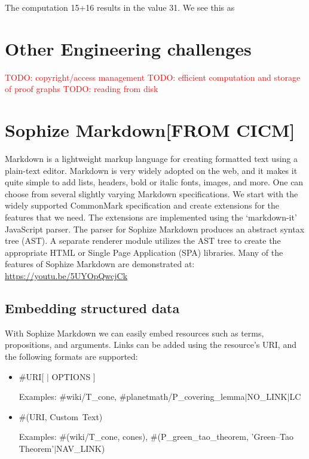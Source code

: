\documentclass[a4paper]{article}
\newcommand\todo[1]{\textcolor{red}{TODO: #1}}
\begin{document}
The computation 15+16 results in the value 31. We see this as 


\section{Other Engineering challenges}
\todo{copyright/access management}
\todo{efficient computation and storage of proof graphs}
\todo{reading from disk }


\section{Sophize Markdown[FROM CICM]}

Markdown is a lightweight markup language for creating formatted text using a plain-text editor. Markdown is very widely adopted on the web, and it makes it quite simple to add lists, headers, bold or italic fonts, images, and more. One can choose from several slightly varying Markdown specifications. We start with the widely supported CommonMark specification and create extensions for the features that we need. The extensions are implemented using the `markdown-it' \cite{markdown_it} JavaScript parser. The parser for Sophize Markdown produces an abstract syntax tree (AST). A separate renderer module utilizes the AST tree to create the appropriate HTML or Single Page Application (SPA) libraries. Many of the features of Sophize Markdown are demonstrated at: \url{https://youtu.be/5UYOpQwcjCk}

\subsection{Embedding structured data}

With Sophize Markdown we can easily embed resources such as terms, propositions, and arguments. Links can be added using the resource's URI, and the following formats are supported:


\begin{itemize}

	\item \#URI[ $\vert$ OPTIONS ]

	Examples: \#wiki/T\_cone, \#planetmath/P\_covering\_lemma$\vert$NO\_LINK$\vert$LC

	\item \#(URI, \textquotesingle Custom\ Text)

	Examples: \#(wiki/T\_cone, \textquotesingle cones\textquotesingle), \#(P\_green\_tao\_theorem, 'Green–Tao Theorem'$\vert$NAV\_LINK)

\end{itemize}
\end{document}
